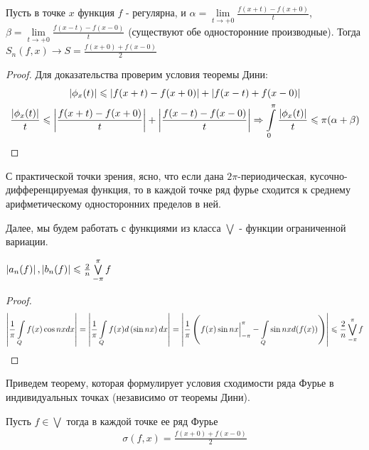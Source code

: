 \begin{corollary}
	Пусть в точке $x$ функция $f$ - регулярна, и 
	$\alpha = \lim\limits_{t\rightarrow +0}\frac{f(x + t) - f(x + 0)}{t}$,
	$\beta = \lim\limits_{t\rightarrow +0}\frac{f(x - t) - f(x - 0)}{t}$
	(существуют обе односторонние производные).
	Тогда $S_n(f, x) \rightarrow S = \frac{f(x + 0) + f(x - 0)}{2}$
\end{corollary}
	
\begin{proof}
	Для доказательства проверим условия теоремы Дини:
	\begin{gather*}
		\left|\phi_x(t)\right| \leqslant \left|f(x + t) - f(x + 0)\right| + \left|f(x - t) + f(x - 0)\right|\\
		\frac{\left|\phi_x(t)\right|}{t} \leqslant \left|\frac{f(x + t) - f(x + 0)}{t}\right| + 
		\left|\frac{f(x - t) - f(x - 0)}{t}\right|\Rightarrow
		\int\limits_{0}^{\pi} \frac{\left|\phi_x(t)\right|}{t} \leqslant \pi(\alpha + \beta)
	\end{gather*}
\end{proof}


С практической точки зрения, ясно, что если дана $2\pi$-периодическая, 
кусочно-дифференцируемая функция, то в каждой точке 
ряд фурье сходится к среднему арифметическому односторонних пределов в ней.

Далее, мы будем работать с функциями из класса $\bigvee$ - функции ограниченной вариации.
\begin{statement}
	$\left|a_n(f)\right|, \left|b_n(f)\right| \leqslant \frac{2}{n}\bigvee\limits_{-\pi}^{\pi} f$
\end{statement}

\begin{proof}
	\begin{gather*}
		\left|\frac{1}{\pi}\int\limits_{Q}f(x)\cos nx dx\right| = 
		\left|\frac{1}{\pi}\int\limits_{Q} f(x) d\left(\sin nx \right)dx \right| =
		\left|\frac{1}{\pi} \left( f(x) \sin nx \Big|_{-\pi}^{\pi} - 
		\int\limits_{Q} \sin nx d( f(x))\right)\right| \leqslant \frac{2}{n}\bigvee\limits_{-\pi}^{\pi} f
	\end{gather*}
\end{proof}

Приведем теорему, которая формулирует условия сходимости ряда Фурье в индивидуальных точках 
(независимо от теоремы Дини).

\begin{theorem}
	Пусть $f \in \bigvee$ тогда в каждой точке ее ряд Фурье 
	\begin{gather*}
		\sigma(f,x) = \frac{f(x + 0) + f(x - 0)}{2}
	\end{gather*}
\end{theorem}

